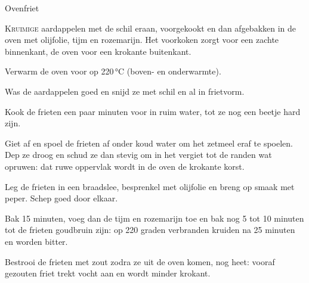 \begin{recipe}{Ovenfriet}
\label{recipe:ovenfriet}


\lettrine{K}{ruimige} aardappelen met de schil eraan, voorgekookt en dan
afgebakken in de oven met olijfolie, tijm en rozemarijn. Het voorkoken
zorgt voor een zachte binnenkant, de oven voor een krokante buitenkant.

\begin{ingredients}
\end{ingredients}

\begin{steps}
  \item Verwarm de oven voor op 220\,°C (boven- en onderwarmte).
  \item Was de aardappelen goed en snijd ze met schil en al in frietvorm.
  \item Kook de frieten een paar minuten voor in ruim water, tot ze nog
        een beetje hard zijn.
  \item Giet af en spoel de frieten af onder koud water om het zetmeel
        eraf te spoelen. Dep ze droog en schud ze dan stevig om in het
        vergiet tot de randen wat opruwen: dat ruwe oppervlak wordt in
        de oven de krokante korst.
  \item Leg de frieten in een braadslee, besprenkel met olijfolie en
        breng op smaak met peper. Schep goed door elkaar.
  \item Bak 15 minuten, voeg dan de tijm en rozemarijn toe en bak nog 5
        tot 10 minuten tot de frieten goudbruin zijn: op 220 graden
        verbranden kruiden na 25 minuten en worden bitter.
  \item Bestrooi de frieten met zout zodra ze uit de oven komen, nog heet:
        vooraf gezouten friet trekt vocht aan en wordt minder krokant.
\end{steps}
\end{recipe}

